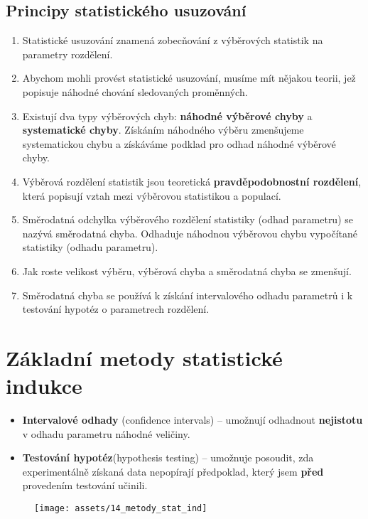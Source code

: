 \subsection{Principy statistického usuzování}
\begin{enumerate}
    \item Statistické usuzování znamená zobecňování z výběrových statistik na parametry rozdělení.
    \item Abychom mohli provést statistické usuzování, musíme mít nějakou teorii, jež popisuje náhodné chování sledovaných proměnných.
    \item Existují dva typy výběrových chyb: \textbf{náhodné výběrové chyby} a \textbf{systematické chyby}. Získáním náhodného výběru zmenšujeme systematickou chybu a získáváme podklad pro odhad náhodné výběrové chyby.
    \item Výběrová rozdělení statistik jsou teoretická \textbf{pravděpodobnostní rozdělení}, která popisují vztah mezi výběrovou statistikou a populací.
    \item Směrodatná odchylka výběrového rozdělení statistiky (odhad parametru) se nazývá směrodatná chyba. Odhaduje náhodnou výběrovou chybu vypočítané statistiky (odhadu parametru).
    \item Jak roste velikost výběru, výběrová chyba a směrodatná chyba se zmenšují.
    \item Směrodatná chyba se používá k získání intervalového odhadu parametrů i k testování hypotéz o parametrech rozdělení.
\end{enumerate}
\section{Základní metody statistické indukce}
\begin{itemize}
    \item \textbf{Intervalové odhady} (confidence intervals) -- umožnují odhadnout \textbf{nejistotu} v odhadu parametru náhodné veličiny.
    \item \textbf{Testování hypotéz}(hypothesis testing) -- umožnuje posoudit, zda experimentálně získaná data nepopírají předpoklad, který jsem \textbf{před} provedením testování učinili.
\end{itemize}
\begin{figure}[H]
    \centering
    \texttt{[image: assets/14\_metody\_stat\_ind]}
\end{figure}
